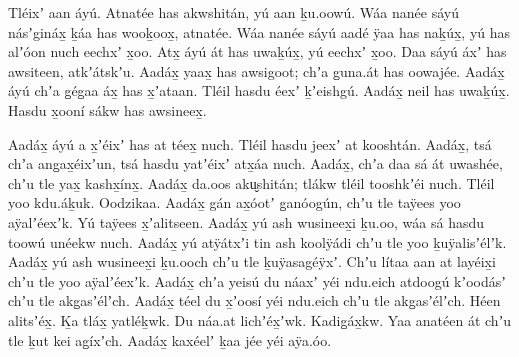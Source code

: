 \clearpage
\begin{pairs}
\begin{Leftside}
\beginnumbering
\pstart\noindent
{}Tléixʼ aan áyú.
Atnatée has akwshitán, yú aan ḵu.oowú.
Wáa nanée sáyú násʼgináx̱ ḵáa has wooḵoox̱, atnatée.
Wáa nanée sáyú aadé ÿaa has naḵúx̱, yú has alʼóon nuch eechxʼ x̱oo.
Atx̱ áyú át has uwaḵúx̱, yú eechxʼ x̱oo.
Daa sáyú áxʼ has awsiteen, atkʼátskʼu.
Aadáx̱ yaax̱ has awsigoot;
chʼa g̱una.át has oowajée.
Aadáx̱ áyú chʼa g̱ég̱aa áx̱ has x̱ʼataan.
Tléil hasdu éexʼ ḵʼeishgú.
Aadáx̱ neil has uwaḵúx̱.
Hasdu x̱ooní sákw has awsineex̱.
\pend

\pstart
{}Aadáx̱ áyú a x̱ʼéixʼ has at téex̱ nuch.
Tléil hasdu jeexʼ at kooshtán.
Aadáx̱, tsá chʼa ang̱a\-x̱éixʼun, tsá hasdu yatʼéixʼ atx̱áa nuch.
Aadáx̱, chʼa daa sá át uwashée, chʼu tle yax̱ kashx̱ínx̱.
Aadáx̱ da.oos aku̬shitán;
tlákw tléil tooshkʼéi nuch.
Tléil yoo kdu.áḵuk.
Oodzikaa.
Aadáx̱ gán ax̱óotʼ g̱anóogún, chʼu tle taÿees yoo aÿa\-lʼéexʼk.
Yú taÿees x̱ʼalitseen.
Aadáx̱ yú ash wusineex̱i ḵu.oo, wáa sá hasdu toowú unéekw nuch.
Aadáx̱ yú atÿátxʼi tin ash koolÿádi chʼu tle yoo ḵuÿalisʼélʼk.
Aadáx̱ yú ash wusineex̱i ḵu.ooch chʼu tle ḵuÿasagéÿxʼ.
Chʼu lítaa aan at layéix̱i chʼu tle yoo aÿalʼéexʼk.
Aadáx̱ chʼa yeisú du náaxʼ yéi ndu.eich atdoogú kʼoodásʼ chʼu tle akg̱asʼélʼch.
Aadáx̱ téel du x̱ʼoosí yéi ndu.eich chʼu tle akg̱asʼélʼch.
Héen alitsʼéx̱.
Ḵa tláx̱ yatléḵwk.
Du náa.at lichʼéx̱ʼwk.
Kadig̱áx̱kw.
Yaa anatéen át chʼu tle ḵut kei ag̱íxʼch.
Aadáx̱ kaxéelʼ ḵaa jée yéi aÿa.óo.
\pend


\end{Leftside}
\end{pairs}
